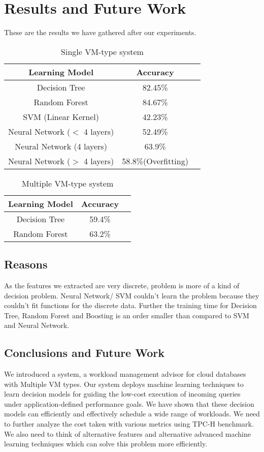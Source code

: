 \chapter{Results and Future Work}
These are the results we have gathered after our experiments.
\begin{center}
\begin{table}[h]
\centering
\begin{tabular}{|c|c|c|}
\hline
Learning Model & Accuracy \\
\hline
Decision Tree & 82.45\% \\
Random Forest & 84.67\% \\
SVM (Linear Kernel) & 42.23\% \\
Neural Network ($<$ 4 layers)& 52.49\% \\
Neural Network (4 layers)& 63.9\% \\
Neural Network ($>$ 4 layers)& 58.8\%(Overfitting) \\
\hline
\end{tabular}
\caption{Single VM-type system}
\label{table:single}
\end{table}
\end{center}

\begin{center}
\begin{table}[h]
\centering
\begin{tabular}{|c|c|c|}
\hline
Learning Model & Accuracy\\
\hline
Decision Tree & 59.4\% \\
Random Forest & 63.2\% \\
\hline
\end{tabular}
\caption{Multiple VM-type system}
\label{table:multiple}
\end{table}
\end{center}



\section{Reasons}
As the features we extracted are very discrete, problem is more of a kind of decision problem. Neural Network/ SVM couldn't learn the problem because they couldn't fit functions for the discrete data. Further the training time for Decision Tree, Random Forest and Boosting is an order smaller than compared to SVM and Neural Network.
\section{Conclusions and Future Work}
We introduced a system, a workload management advisor for cloud databases with Multiple VM types. Our system deploys machine learning techniques to learn decision models for guiding the low-cost execution of incoming queries under application-defined performance goals. We have shown that these decision models can efficiently and effectively schedule a wide range of workloads. We need to further analyze the cost taken with various metrics using TPC-H benchmark\cite{council2008tpc}. We also need to think of alternative features and alternative advanced machine learning techniques which can solve this problem more efficiently.
